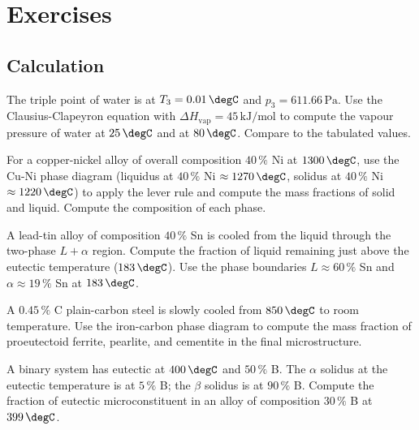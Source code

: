 \section{Exercises}

\subsection*{Calculation}

\begin{exercise}
The triple point of water is at $T_3 = 0.01\,\degC$ and $p_3 =
611.66\,\text{Pa}$. Use the Clausius-Clapeyron equation with
$\Delta H_{\text{vap}} = 45\,\text{kJ}/\text{mol}$ to compute the
vapour pressure of water at $25\,\degC$ and at $80\,\degC$. Compare
to the tabulated values.
\end{exercise}

\begin{exercise}
For a copper-nickel alloy of overall composition $40\,\%$ Ni at
$1300\,\degC$, use the Cu-Ni phase diagram (liquidus at $40\,\%$
Ni $\approx 1270\,\degC$, solidus at $40\,\%$ Ni $\approx 1220\,\degC$)
to apply the lever rule and compute the mass fractions of solid and
liquid. Compute the composition of each phase.
\end{exercise}

\begin{exercise}
A lead-tin alloy of composition $40\,\%$ Sn is cooled from the liquid
through the two-phase $L + \alpha$ region. Compute the fraction of
liquid remaining just above the eutectic temperature ($183\,\degC$).
Use the phase boundaries $L \approx 60\,\%$ Sn and $\alpha \approx
19\,\%$ Sn at $183\,\degC$.
\end{exercise}

\begin{exercise}
A $0.45\,\%$ C plain-carbon steel is slowly cooled from $850\,\degC$
to room temperature. Use the iron-carbon phase diagram to compute the
mass fraction of proeutectoid ferrite, pearlite, and cementite in the
final microstructure.
\end{exercise}

\begin{exercise}
A binary system has eutectic at $400\,\degC$ and $50\,\%$ B. The
$\alpha$ solidus at the eutectic temperature is at $5\,\%$ B; the
$\beta$ solidus is at $90\,\%$ B. Compute the fraction of eutectic
microconstituent in an alloy of composition $30\,\%$ B at $399\,
\degC$.
\end{exercise}

